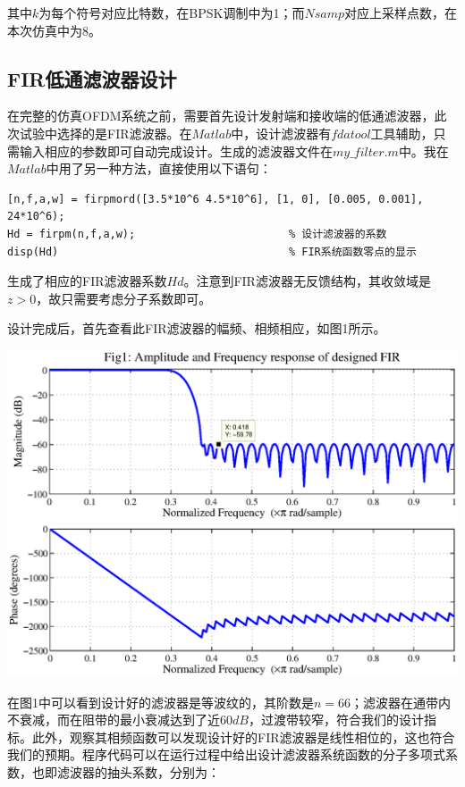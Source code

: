 \documentclass[a4paper,11pt,onecolumn,twoside]{article}
\begin{document}
其中$k$为每个符号对应比特数，在BPSK调制中为1；而$Nsamp$对应上采样点数，在本次仿真中为8。

\subsection{FIR低通滤波器设计}
在完整的仿真OFDM系统之前，需要首先设计发射端和接收端的低通滤波器，此次试验中选择的是FIR滤波器。在$Matlab$中，设计滤波器有$fdatool$工具辅助，只需输入相应的参数即可自动完成设计。生成的滤波器文件在$my\_filter.m$中。我在$Matlab$中用了另一种方法，直接使用以下语句：
\begin{lstlisting}[style=Matlab-editor,
                   basicstyle=\mlttfamily,
                   caption={Parameter for FIR filter}, label=code2]
[n,f,a,w] = firpmord([3.5*10^6 4.5*10^6], [1, 0], [0.005, 0.001], 24*10^6);
Hd = firpm(n,f,a,w);                        % 设计滤波器的系数
disp(Hd)                                    % FIR系统函数零点的显示
\end{lstlisting}
生成了相应的FIR滤波器系数$Hd$。注意到FIR滤波器无反馈结构，其收敛域是$z>0$，故只需要考虑分子系数即可。

设计完成后，首先查看此FIR滤波器的幅频、相频相应，如图1所示。
\begin{center}
    \includegraphics[width=1\textwidth]{fig1.eps}
\end{center}

在图1中可以看到设计好的滤波器是等波纹的，其阶数是$n=66$；滤波器在通带内不衰减，而在阻带的最小衰减达到了近$60dB$，过渡带较窄，符合我们的设计指标。此外，观察其相频函数可以发现设计好的FIR滤波器是线性相位的，这也符合我们的预期。程序代码可以在运行过程中给出设计滤波器系统函数的分子多项式系数，也即滤波器的抽头系数，分别为：
\end{document}
